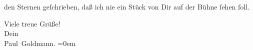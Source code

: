                den Sternen geſchrieben, daß ich nie ein Stück von Dir auf der Bühne{ }ſehen{ }ſoll.\pend
           
\pstart
           Viele treue Grüße! {\\[\baselineskip]}Dein {\\[\baselineskip]}\spacefill\mbox{Paul Goldmann.}\pend
           \leftskip=0em{}\endnumbering{}  \newcommand{\dateiname}{L02910}\newcommand{\titel}{Paul Goldmann an Arthur Schnitzler, 13. 4. [1900]}\newcommand{\editorInnen}{Martin Anton Müller und Laura Untner}
